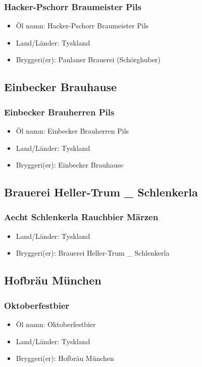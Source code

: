 \documentclass[11pt]{article}
\begin{document}
\subsubsection{Hacker-Pschorr Braumeister Pils}
\label{sec:orgffd5138}
\begin{itemize}
\item Öl namn: Hacker-Pschorr Braumeister Pils
\item Land/Länder: Tyskland
\item Bryggeri(er): Paulaner Brauerei (Schörghuber)
\end{itemize}
\subsection{Einbecker Brauhause}
\label{sec:org0c09df5}
\subsubsection{Einbecker Brauherren Pils}
\label{sec:org39b27f6}
\begin{itemize}
\item Öl namn: Einbecker Brauherren Pils
\item Land/Länder: Tyskland
\item Bryggeri(er): Einbecker Brauhause
\end{itemize}
\subsection{Brauerei Heller-Trum \_ Schlenkerla}
\label{sec:orga8b5f4c}
\subsubsection{Aecht Schlenkerla Rauchbier Märzen}
\label{sec:org0ccdd48}
\begin{itemize}
\item Land/Länder: Tyskland
\item Bryggeri(er): Brauerei Heller-Trum \_ Schlenkerla
\end{itemize}
\subsection{Hofbräu München}
\label{sec:orga073405}
\subsubsection{Oktoberfestbier}
\label{sec:org32cfcb5}
\begin{itemize}
\item Öl namn: Oktoberfestbier
\item Land/Länder: Tyskland
\item Bryggeri(er): Hofbräu München
\end{itemize}
\end{document}
